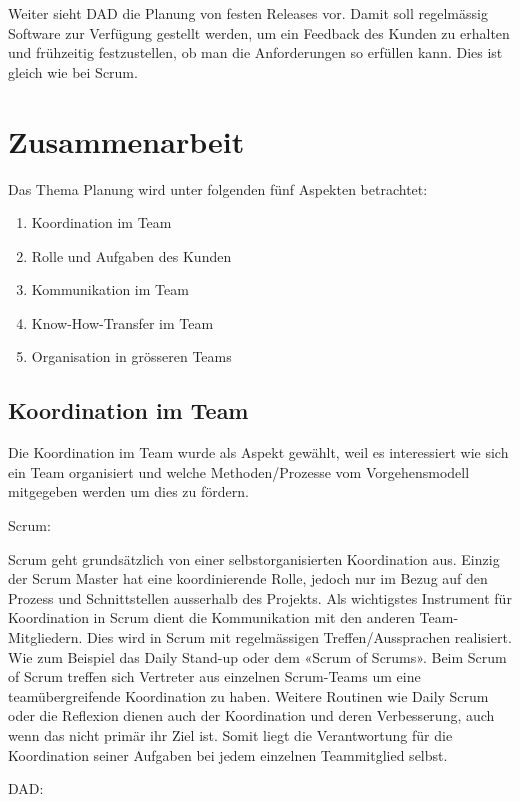 Weiter sieht DAD die Planung von festen Releases vor. Damit soll regelmässig Software zur Verfügung gestellt werden, um ein Feedback des Kunden zu erhalten und frühzeitig festzustellen, ob man die Anforderungen so erfüllen kann. Dies ist gleich wie bei Scrum.

\section{Zusammenarbeit}


Das Thema Planung wird unter folgenden fünf Aspekten betrachtet:
\begin{enumerate}
	\item Koordination im Team
	\item Rolle und Aufgaben des Kunden
	\item Kommunikation im Team
	\item Know-How-Transfer im Team
	\item Organisation in grösseren Teams
\end{enumerate}

\subsection{Koordination im Team}


Die Koordination im Team wurde als Aspekt gewählt, weil es interessiert wie sich ein Team organisiert und welche Methoden/Prozesse vom Vorgehensmodell mitgegeben werden um dies zu fördern. \medskip

{\Large Scrum:} \medskip

Scrum geht grundsätzlich von einer selbstorganisierten Koordination aus. Einzig der Scrum Master hat eine koordinierende Rolle, jedoch nur im Bezug auf den Prozess und Schnittstellen ausserhalb des Projekts.
Als wichtigstes Instrument für Koordination in Scrum dient die Kommunikation mit den anderen Team-Mitgliedern. Dies wird in Scrum mit regelmässigen Treffen/Aussprachen realisiert. Wie zum Beispiel das Daily Stand-up oder dem «Scrum of Scrums». Beim Scrum of Scrum treffen sich Vertreter aus einzelnen Scrum-Teams um eine teamübergreifende Koordination zu haben. Weitere Routinen wie Daily Scrum oder die Reflexion dienen auch der Koordination und deren Verbesserung, auch wenn das nicht primär ihr Ziel ist.
Somit liegt die Verantwortung für die Koordination seiner Aufgaben bei jedem einzelnen Teammitglied selbst.

\bigskip 

{\Large DAD:} \cite{collabCoordInTeamDad} \medskip

